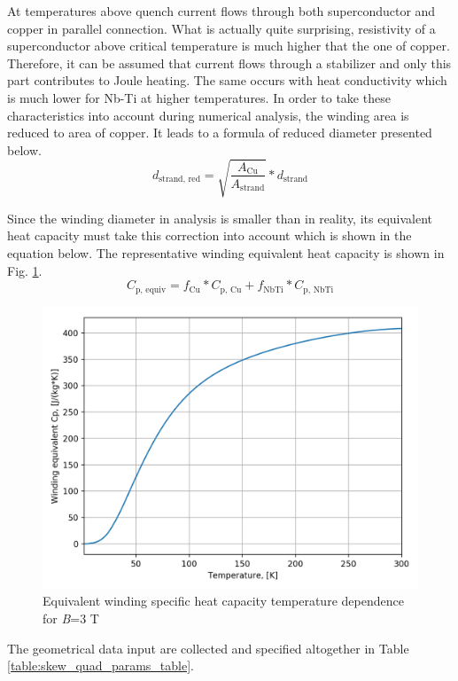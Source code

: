 At temperatures above quench current flows through both superconductor and copper in parallel connection. What is actually quite surprising, resistivity of a superconductor above critical temperature is much higher that the one of copper. Therefore, it can be assumed that current flows through a stabilizer and only this part contributes to Joule heating. The same occurs with heat conductivity which is much lower for Nb-Ti at higher temperatures. In order to take these characteristics into account during numerical analysis, the winding area is reduced to area of copper. It leads to a formula of reduced diameter presented below.
\begin{equation}
    d_\text{strand, red} = \sqrt{\frac{A_\text{Cu}}{A_\text{strand}}}*d_\text{strand}
\end{equation}

Since the winding diameter in analysis is smaller than in reality, its equivalent heat capacity must take this correction into account which is shown in the equation below. The representative winding equivalent heat capacity is shown in Fig. \ref{fig:eq_wind_cp}.
\begin{equation}
    C_\text{p, equiv} = f_\text{Cu}*C_\text{p, Cu} + f_\text{NbTi}*C_\text{p, NbTi}
\end{equation}
 
\begin{figure}[h!]
    \centering
    \includegraphics[width=0.35\linewidth]{figures/material_properties/Eq_Cp_plot.png}
    \caption{Equivalent winding specific heat capacity temperature dependence for \textit{B}=3 T}
    \label{fig:eq_wind_cp}
\end{figure}

The geometrical data input are collected and specified altogether in Table \ref{table:skew_quad_params_table}.

